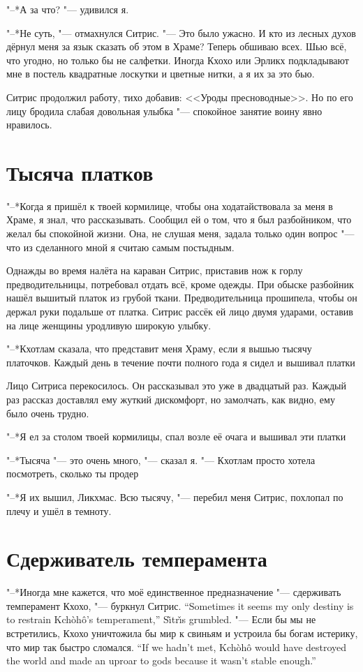 "--*А за что? "--- удивился я.

"--*Не суть, "--- отмахнулся Ситрис.
"--- Это было ужасно.
И кто из лесных духов дёрнул меня за язык сказать об этом в Храме?
Теперь обшиваю всех.
Шью всё, что угодно, но только бы не салфетки.
Иногда Кхохо или Эрликх подкладывают мне в постель квадратные лоскутки и цветные нитки, а я их за это бью.

Ситрис продолжил работу, тихо добавив: <<Уроды пресноводные>>.
Но по его лицу бродила слабая довольная улыбка "--- спокойное занятие воину явно нравилось.

\section{Тысяча платков}

"--*Когда я пришёл к твоей кормилице, чтобы она ходатайствовала за меня в Храме, я знал, что рассказывать.
Сообщил ей о том, что я был разбойником, что желал бы спокойной жизни.
Она, не слушая меня, задала только один вопрос "--- что из сделанного мной я считаю самым постыдным.

Однажды во время налёта на караван Ситрис, приставив нож к горлу предводительницы, потребовал отдать всё, кроме одежды.
При обыске разбойник нашёл вышитый платок из грубой ткани.
Предводительница прошипела, чтобы он держал руки подальше от платка.
Ситрис рассёк ей лицо двумя ударами, оставив на лице женщины уродливую широкую улыбку.

"--*Кхотлам сказала, что представит меня Храму, если я вышью тысячу платочков.
Каждый день в течение почти полного года я сидел и вышивал платки\ldotst

Лицо Ситриса перекосилось.
Он рассказывал это уже в двадцатый раз.
Каждый раз рассказ доставлял ему жуткий дискомфорт, но замолчать, как видно, ему было очень трудно.

"--*Я ел за столом твоей кормилицы, спал возле её очага и вышивал эти платки\ldotst

"--*Тысяча "--- это очень много, "--- сказал я.
"--- Кхотлам просто хотела посмотреть, сколько ты продер\ldotst

"--*Я их вышил, Ликхмас.
Всю тысячу, "--- перебил меня Ситрис, похлопал по плечу и ушёл в темноту.

\section{Сдерживатель темперамента}

{"--*Иногда мне кажется, что моё единственное предназначение "--- сдерживать темперамент Кхохо, "--- буркнул Ситрис.}
{``Sometimes it seems my only destiny is to restrain Kch\`{o}h\^{o}'s temperament,'' S\~{\i}tr\v{\i}s grumbled.}
{"--- Если бы мы не встретились, Кхохо уничтожила бы мир к свиньям и устроила бы богам истерику, что мир так быстро сломался.}
{``If we hadn't met, Kch\`{o}h\^{o} would have destroyed the world and made an uproar to gods because it wasn't stable enough.''}

